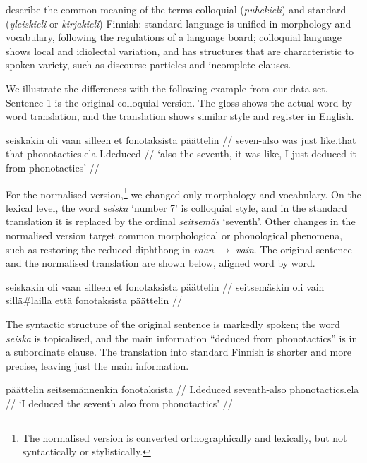 \documentclass[11pt]{article}
\begin{document}
 describe the common meaning of the terms colloquial (\emph{puhekieli}) and standard (\emph{yleiskieli} or \emph{kirjakieli}) Finnish: standard language is unified in morphology and vocabulary, following the regulations of a language board; colloquial language shows local and idiolectal variation, and has structures that are characteristic to spoken variety,  such as discourse particles and incomplete clauses. 

We illustrate the differences with the following example from our data set. Sentence 1 is the original colloquial version. The gloss shows the actual word-by-word translation, and the translation shows similar style and register in English.

\ex
\begingl
\gla seiskakin oli vaan silleen et fonotaksista p\"{a}\"{a}ttelin //
\glb seven-{\sc also} was just like.that that phonotactics.{\sc ela} I.deduced //
\glft `also the seventh, it was like, I just deduced it from phonotactics' //
\endgl
\xe


For the normalised version,\footnote{The normalised version is converted orthographically and lexically, but not syntactically or stylistically.} we changed only morphology and vocabulary. On the lexical level, the word \emph{seiska} `number 7' is colloquial style, and in the standard translation it is replaced by the ordinal \emph{seitsem\"{a}s} `seventh'.  Other changes in the normalised version target common morphological or phonological phenomena, such as restoring the reduced diphthong in \emph{vaan} $\rightarrow$ \emph{vain}. The original sentence and the normalised translation are shown below, aligned word by word.

\ex
\begingl
\gla seiskakin oli vaan silleen et fonotaksista p\"{a}\"{a}ttelin //
\glb seitsem\"{a}skin oli vain sill\"{a}\#lailla ett\"{a} fonotaksista p\"{a}\"{a}ttelin //
\endgl
\xe

 The syntactic structure of the original sentence is markedly spoken; the word \emph{seiska} is topicalised, and the main information ``deduced from phonotactics'' is in a subordinate clause. 
The translation into standard Finnish is shorter and more precise, leaving just the main information.

\ex
\begingl
\gla p\"{a}\"{a}ttelin seitsem\"{a}nnenkin fonotaksista //
\glb I.deduced seventh-{\sc also} phonotactics.{\sc ela} //
\glft `I deduced the seventh also from phonotactics' //
\endgl
\xe
\end{document}
